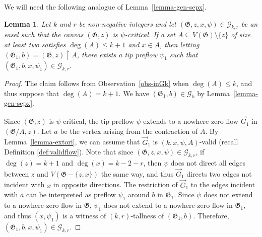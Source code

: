 \documentclass{article}
\newcommand{\GG}{\mathcal{G}}
\newcommand\g{\mathfrak{G}}
\newtheorem{lemma}[theorem]{Lemma}
\begin{document}
We will need the following analogue of Lemma~\ref{lemma-gen-sepx}.
\begin{lemma}\label{lemma-genladeg-sepx}
Let $k$ and $r$ be non-negative integers and let $(\g,z,x,\psi)\in \GG_{k,r}$ be an easel such that the canvas $(\g,z)$ is $\psi$-critical.
If a set $A\subseteq V(\g)\setminus \{z\}$ of size at least two satisfies $\deg(A)\le k+1$ and $x\in A$,
then letting $(\g_1,b)=(\g,z)\restriction A$, there exists a tip preflow $\psi_1$ such that $(\g_1,b,x,\psi_1)\in \GG_{k,r}$.
\end{lemma}
\begin{proof}
The claim follows from Observation~\ref{obs-inGk} when $\deg(A)\le k$, and thus suppose that $\deg(A)=k+1$.
We have $(\g_1,b)\in \GG_k$ by Lemma~\ref{lemma-gen-sepx}.

Since $(\g,z)$ is $\psi$-critical, the tip preflow $\psi$ extends to a nowhere-zero flow $\vec{G}_1$ in $(\g/A,z)$.  Let $a$ be the vertex arising from the contraction of $A$.
By Lemma~\ref{lemma-extori}, we can assume that $\vec{G}_1$ is $(k,x,\psi,A)$-valid (recall Definition \ref{def:validflow}).  Note that since $(\g,z,x,\psi)\in \GG_{k,r}$, if $\deg(z)=k+1$
and $\deg(x)=k-2-r$, then $\psi$ does not direct all edges between $z$ and $V(\g-\{z,x\})$ the same way, and thus $\vec{G}_1$ directs two edges not incident with $x$ in opposite directions.
The restriction of $\vec{G}_1$ to the edges incident with $a$ can be interpreted as preflow $\psi_1$
around $b$ in $\g_1$. Since $\psi$ does not extend to a nowhere-zero flow in $\g$, $\psi_1$ does not extend to a nowhere-zero flow in $\g_1$,
and thus $(x,\psi_1)$ is a witness of $(k,r)$-tallness of $(\g_1,b)$.  Therefore, $(\g_1,b,x,\psi_1)\in \GG_{k,r}$.
\end{proof}
\end{document}
